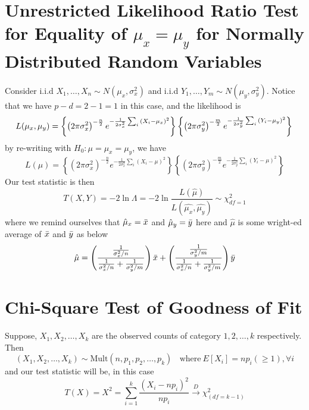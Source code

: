 \documentclass{article}
\begin{document}
\section{Unrestricted Likelihood Ratio Test for Equality of $\mu_x = \mu_y$ for Normally Distributed Random Variables}
Consider i.i.d $X_1,\ldots,X_n \sim N(\mu_x, \sigma_x^2)$ and i.i.d $Y_1,\ldots,Y_m \sim N(\mu_y, \sigma_y^2)$. Notice that we have $p-d = 2 - 1 = 1$ in this case, and the likelihood is
\begin{equation*}
    L(\mu_x, \mu_y) = \left\{\left(2\pi \sigma_x^2\right)^{-\frac{n}{2}}e^{-\frac{1}{2\sigma_x^2}\sum_i{\left(X_i - \mu_x\right)^2}}\right\} \left\{\left(2\pi \sigma_y^2\right)^{-\frac{m}{2}}e^{-\frac{1}{2\sigma_y^2}\sum_i{\left(Y_i - \mu_y\right)^2}}\right\} \\
\end{equation*}    
by re-writing with $H_0: \mu = \mu_x = \mu_y$, we have
\begin{equation*}
    L(\mu) = \left\{\left(2\pi \sigma_x^2\right)^{-\frac{n}{2}}e^{-\frac{1}{2\sigma_x^2}\sum_i{\left(X_i - \mu\right)^2}}\right\} \left\{\left(2\pi \sigma_y^2\right)^{-\frac{m}{2}}e^{-\frac{1}{2\sigma_y^2}\sum_i{\left(Y_i - \mu\right)^2}}\right\}
\end{equation*}
Our test statistic is then
\begin{equation*}
    T(X,Y) = -2 \ln \Lambda = -2 \ln \frac{L(\hat{\mu})}{L(\hat{\mu_x}, \hat{\mu_y})} \sim \chi^2_{df = 1}
\end{equation*}
where we remind ourselves that $\hat{\mu}_x = \Bar{x}$ and $\hat{\mu}_y = \Bar{y}$ here and $\hat{\mu}$ is some wright-ed average of $\Bar{x}$ and $\Bar{y}$ as below
\begin{equation*}
    \hat{\mu} = \left( \frac{\frac{1}{\sigma^2_x/n}}{ \frac{1}{\sigma^2_x/n} + \frac{1}{\sigma^2_y/m} }\right)\Bar{x} + \left( \frac{\frac{1}{\sigma^2_y/m}}{ \frac{1}{\sigma^2_x/n} + \frac{1}{\sigma^2_y/m} }\right)\Bar{y}
\end{equation*}

\section{Chi-Square Test of Goodness of Fit}
Suppose, $X_1, X_2, \ldots, X_k$ are the observed counts of category $1, 2, \ldots, k$ respectively. Then
\begin{equation*}
    (X_1, X_2, \ldots, X_k) \sim \text{Mult}(n, p_1, p_2, \ldots, p_k)~~~~\text{where}~E[X_i] = np_i (\geq 1), \forall i
\end{equation*}
and our test statistic will be, in this case
\begin{equation*}
    T(X) = X^2 = \sum_{i = 1}^k \frac{\left(X_i - np_i\right)^2}{np_i} \xrightarrow{D} \chi^2_{(df=k-1)}
\end{equation*}
\end{document}
